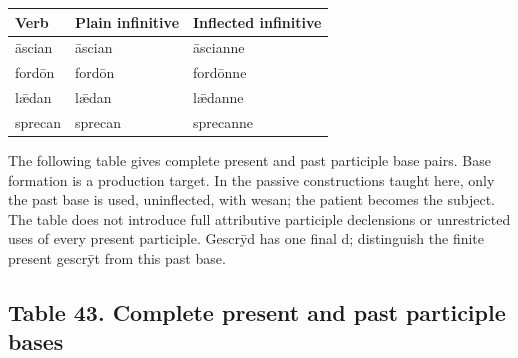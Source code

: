 \par\begingroup
\fontsize{10.5}{13.2}\selectfont
\setlength{\LTleft}{0pt}\setlength{\LTright}{\fill}
\noindent
\begin{tabular}{@{}>{\raggedright\arraybackslash}p{31.82mm}>{\raggedright\arraybackslash}p{40.41mm}>{\raggedright\arraybackslash}p{46.14mm}@{}}
\toprule
\textbf{Verb} & \textbf{Plain infinitive} & \textbf{Inflected infinitive} \\
\midrule
āscian & āscian & āscianne \\
fordōn & fordōn & fordōnne \\
lǣdan & lǣdan & lǣdanne \\
sprecan & sprecan & sprecanne \\
\bottomrule
\end{tabular}
\par\endgroup

The following table gives complete present and past participle base pairs. Base formation is a production target. In the passive constructions taught here, only the past base is used, uninflected, with wesan; the patient becomes the subject. The table does not introduce full attributive participle declensions or unrestricted uses of every present participle. Gescrȳd has one final d; distinguish the finite present gescrȳt from this past base.

\subsection*{Table 43. Complete present and past participle bases}

